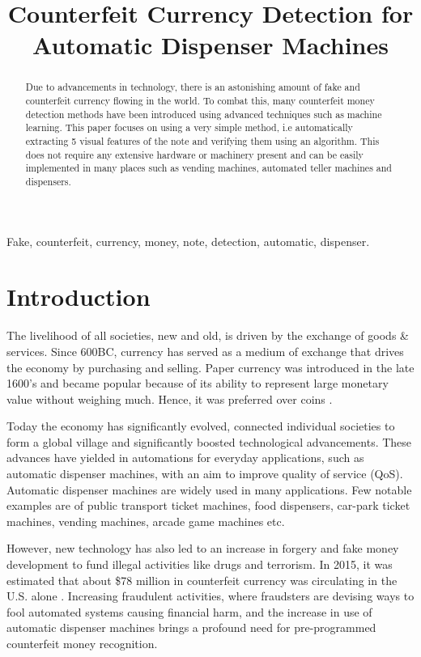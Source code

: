 \documentclass{article}
\title{Counterfeit Currency Detection for Automatic Dispenser Machines}
\begin{document}
%

\maketitle
%
\begin{abstract}
Due to advancements in technology, there is an astonishing amount of fake and counterfeit currency flowing in the world. To combat this, many counterfeit money detection methods have been introduced using advanced techniques such as machine learning. This paper focuses on using a very simple method, i.e automatically extracting 5 visual features of the note and verifying them using an algorithm. This does not require any extensive hardware or machinery present and can be easily implemented in many places such as vending machines, automated teller machines and dispensers.
\end{abstract}
%
\begin{keywords}
Fake, counterfeit, currency, money, note, detection, automatic, dispenser.
\end{keywords}
%
\section{Introduction}
\label{sec:intro}

The livelihood of all societies, new and old, is driven by the exchange of goods \& services. Since 600BC, currency has served as a medium of exchange that drives the economy by purchasing and selling. Paper currency was introduced in the late 1600’s and became popular because of its ability to represent large monetary value without weighing much. Hence, it was preferred over coins \cite{ScaleUp_MLSP:1}.

Today the economy has significantly evolved, connected individual societies to form a global village and significantly boosted technological advancements. These advances have yielded in automations for everyday applications, such as automatic dispenser machines, with an aim to improve quality of service (QoS). Automatic dispenser machines are widely used in many applications. Few notable examples are of public transport ticket machines, food dispensers, car-park ticket machines, vending machines, arcade game machines etc.

However, new technology has also led to an increase in forgery and fake money development to fund illegal activities like drugs and terrorism. In 2015, it was estimated that about \$78 million in counterfeit currency was circulating in the U.S. alone \cite{ScaleUp_MLSP:2}. Increasing fraudulent activities, where fraudsters are devising ways to fool automated systems causing financial harm, and the increase in use of automatic dispenser machines brings a profound need for pre-programmed counterfeit money recognition.
\end{document}
